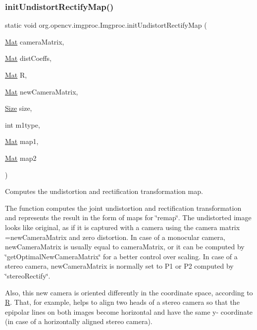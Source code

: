\subsubsection{\texorpdfstring{init\+Undistort\+Rectify\+Map()}{initUndistortRectifyMap()}}
{\footnotesize\ttfamily static void org.\+opencv.\+imgproc.\+Imgproc.\+init\+Undistort\+Rectify\+Map (\begin{DoxyParamCaption}\item[{\mbox{\hyperlink{classorg_1_1opencv_1_1core_1_1_mat}{Mat}}}]{camera\+Matrix,  }\item[{\mbox{\hyperlink{classorg_1_1opencv_1_1core_1_1_mat}{Mat}}}]{dist\+Coeffs,  }\item[{\mbox{\hyperlink{classorg_1_1opencv_1_1core_1_1_mat}{Mat}}}]{R,  }\item[{\mbox{\hyperlink{classorg_1_1opencv_1_1core_1_1_mat}{Mat}}}]{new\+Camera\+Matrix,  }\item[{\mbox{\hyperlink{classorg_1_1opencv_1_1core_1_1_size}{Size}}}]{size,  }\item[{int}]{m1type,  }\item[{\mbox{\hyperlink{classorg_1_1opencv_1_1core_1_1_mat}{Mat}}}]{map1,  }\item[{\mbox{\hyperlink{classorg_1_1opencv_1_1core_1_1_mat}{Mat}}}]{map2 }\end{DoxyParamCaption})\hspace{0.3cm}{\ttfamily [static]}}

Computes the undistortion and rectification transformation map.

The function computes the joint undistortion and rectification transformation and represents the result in the form of maps for \char`\"{}remap\char`\"{}. The undistorted image looks like original, as if it is captured with a camera using the camera matrix {\ttfamily =new\+Camera\+Matrix} and zero distortion. In case of a monocular camera, {\ttfamily new\+Camera\+Matrix} is usually equal to {\ttfamily camera\+Matrix}, or it can be computed by \char`\"{}get\+Optimal\+New\+Camera\+Matrix\char`\"{} for a better control over scaling. In case of a stereo camera, {\ttfamily new\+Camera\+Matrix} is normally set to {\ttfamily P1} or {\ttfamily P2} computed by \char`\"{}stereo\+Rectify\char`\"{}.

Also, this new camera is oriented differently in the coordinate space, according to {\ttfamily \mbox{\hyperlink{classorg_1_1opencv_1_1_r}{R}}}. That, for example, helps to align two heads of a stereo camera so that the epipolar lines on both images become horizontal and have the same y-\/ coordinate (in case of a horizontally aligned stereo camera).

